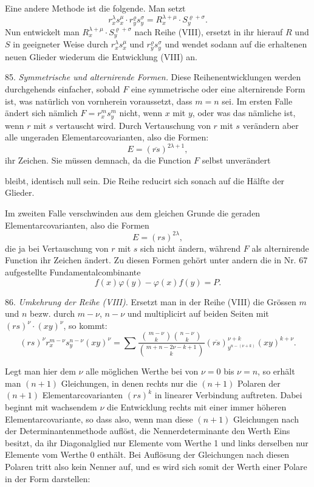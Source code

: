Eine andere Methode ist die folgende. Man setzt
\[
r_x^\lambda s_x^\mu\cdot r_y^\varrho s_y^\sigma=R_x^{\lambda+\mu}\cdot S_y^{\varrho+\sigma}.
\]
Nun entwickelt man $R_x^{\lambda+\mu}\cdot S_y^{\varrho+\sigma}$ nach Reihe (VIII), ersetzt in ihr hierauf $R$ und $S$ in geeigneter Weise durch $r_x^\lambda s_x^\mu$ und $r_y^\varrho s_y^\sigma$ und wendet sodann auf die erhaltenen neuen Glieder wiederum die Entwicklung (VIII) an.

85. \textit{Symmetrische und alternirende Formen.} Diese Reihenentwicklungen werden durchgehends einfacher, sobald $F$ eine symmetrische oder eine alternirende Form ist, was natürlich von vornherein voraussetzt, dass $m=n$ sei. Im ersten Falle ändert sich nämlich $F=r_x^m s_y^m$ nicht, wenn $x$ mit $y$, oder was das nämliche ist, wenn $r$ mit $s$ vertauscht wird. Durch Vertauschung von $r$ mit $s$ verändern aber alle ungeraden Elementarcovarianten, also die Formen:
\[
E=(\overline{rs})^{2\lambda+1},
\]
ihr Zeichen. Sie müssen demnach, da die Function $F$ selbst unverändert


bleibt, identisch null sein. Die Reihe reducirt sich sonach auf die H\"alfte der Glieder.

Im zweiten Falle verschwinden aus dem gleichen Grunde die geraden Elementarcovarianten, also die Formen
\[
E = (rs)^{2\lambda},
\]
die ja bei Vertauschung von $r$ mit $s$ sich nicht \"andern, w\"ahrend $F$ als alternirende Function ihr Zeichen \"andert. Zu diesen Formen geh\"ort unter andern die in Nr. 67 aufgestellte Fundamentalcombinante
\[
f(x)\varphi(y) - \varphi(x)f(y) = P.
\]

86. \textit{Umkehrung der Reihe (VIII).} Ersetzt man in der Reihe (VIII) die Gr\"ossen $m$ und $n$ bezw. durch $m-\nu$, $n-\nu$ und multiplicirt auf beiden Seiten mit $(rs)^\nu \cdot (xy)^\nu$, so kommt:
\[
(rs)^\nu r_x^{m-\nu} s_y^{n-\nu} (xy)^\nu = \sum \frac{\binom{m-\nu}{k}\binom{n-\nu}{k}}{\binom{m+n-2\nu-k+1}{k}} (\overline{rs})_{y^{n-(\nu+k)}}^{\nu+k} (xy)^{k+\nu}. %
\]

Legt man hier dem $\nu$ alle m\"oglichen Werthe bei von $\nu = 0$ bis $\nu = n$, so erh\"alt man $(n+1)$ Gleichungen, in denen rechts nur die $(n+1)$ Polaren der $(n+1)$ Elementarcovarianten $(rs)^k$ in linearer Verbindung auftreten. Dabei beginnt mit wachsendem $\nu$ die Entwicklung rechts mit einer immer h\"oheren Elementarcovariante, so dass also, wenn man diese $(n+1)$ Gleichungen nach der Determinantenmethode aufl\"ost, die Nennerdeterminante den Werth Eins besitzt, da ihr Diagonalglied nur Elemente vom Werthe 1 und links derselben nur Elemente vom Werthe 0 enth\"alt. Bei Aufl\"osung der Gleichungen nach diesen Polaren tritt also kein Nenner auf, und es wird sich somit der Werth einer Polare in der Form darstellen:

